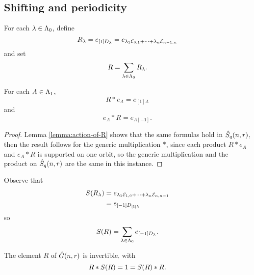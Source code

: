 \documentclass[a4paper, 11pt]{report}
\begin{document}
\subsection{Shifting and periodicity}

For each $\lambda\in\Lambda_0{}$, define
\begin{equation*}
R_\lambda = e_{[1]D_\lambda} = e_{\lambda_1\mathcal{E}_{0,1} + \cdots + \lambda_n\mathcal{E}_{n-1,n}}
\end{equation*}
and set
\begin{equation*}
R=\sum_{\lambda\in\Lambda_0{}} R_\lambda.
\end{equation*}

\begin{lemma}\label{lemma:action-of-R-generic}
For each $A\in\Lambda_1{}$,
\begin{equation*}
R\ast e_A = e_{[1]A}
\end{equation*}
and
\begin{equation*}
e_A\ast R = e_{A[-1]}.
\end{equation*}
\end{lemma}

\begin{proof}
Lemma \ref{lemma:action-of-R} shows that the same formulas hold in $\hat{S}_q(n,r)$, then the result follows for the generic multiplication $\ast$, since each product $R\ast e_A$ and $e_A \ast R$ is supported on one orbit, so the generic multiplication and the product on $\hat{S}_q(n,r)$ are the same in this instance.
\end{proof} 

Observe that
\begin{align*}
S{(R_\lambda)} &= e_{\lambda_1\mathcal{E}_{1,0}+\cdots +\lambda_n\mathcal{E}_{n,n-1}}\\
&= e_{[-1]D_{[1]\lambda}}
\end{align*}
so
\begin{equation*}
S{(R)} = \sum_{\lambda\in\Lambda_0{}} e_{[-1]D_\lambda}.
\end{equation*}

\begin{lemma}\label{lemma:R-is-a-unit-generic}
The element $R$ of $\hat{G}(n,r)$ is invertible, with
\begin{equation*}
R \ast S{(R)} = 1 = S{(R)}\ast R.
\end{equation*}
\end{lemma}
\end{document}
